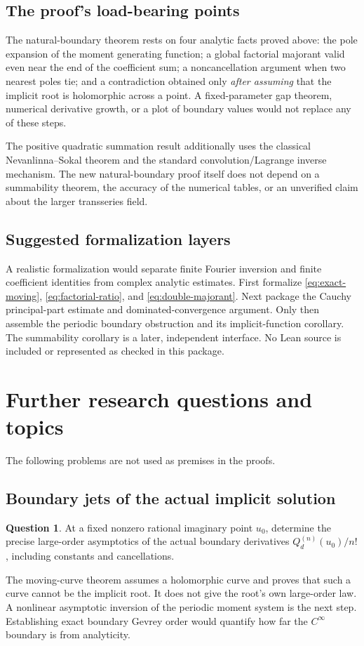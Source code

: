 \documentclass[11pt,a4paper]{article}
\numberwithin{equation}{section}
\theoremstyle{definition}\newtheorem{definition}[theorem]{Definition}
\newtheorem{question}[theorem]{Question}
\theoremstyle{remark}\newtheorem{remark}[theorem]{Remark}
\theoremstyle{definition}
\begin{document}
\subsection{The proof's load-bearing points}
The natural-boundary theorem rests on four analytic facts proved above:
the pole expansion of the moment generating function; a global factorial
majorant valid even near the end of the coefficient sum; a noncancellation
argument when two nearest poles tie; and a contradiction obtained only
\emph{after assuming} that the implicit root is holomorphic across a point.
A fixed-parameter gap theorem, numerical derivative growth, or a plot of
boundary values would not replace any of these steps.

The positive quadratic summation result additionally uses the classical
Nevanlinna--Sokal theorem and the standard convolution/Lagrange inverse
mechanism. The new natural-boundary proof itself does not depend on a
summability theorem, the accuracy of the numerical tables, or an unverified
claim about the larger transseries field.

\subsection{Suggested formalization layers}
A realistic formalization would separate finite Fourier inversion and finite
coefficient identities from complex analytic estimates. First formalize
\eqref{eq:exact-moving}, \eqref{eq:factorial-ratio}, and
\eqref{eq:double-majorant}. Next package the Cauchy principal-part estimate
and dominated-convergence argument. Only then assemble the periodic boundary
obstruction and its implicit-function corollary. The summability corollary is
a later, independent interface. No Lean source is included or represented as
checked in this package.

\section{Further research questions and topics}
\label{sec:questions}
The following problems are not used as premises in the proofs.

\subsection{Boundary jets of the actual implicit solution}
\begin{question}
At a fixed nonzero rational imaginary point $u_0$, determine the precise
large-order asymptotics of the actual boundary derivatives
$Q_d^{(n)}(u_0)/n!$, including constants and cancellations.
\end{question}
The moving-curve theorem assumes a holomorphic curve and proves that such a
curve cannot be the implicit root. It does not give the root's own
large-order law. A nonlinear asymptotic inversion of the periodic moment
system is the next step. Establishing exact boundary Gevrey order would
quantify how far the $C^\infty$ boundary is from analyticity.
\end{document}
